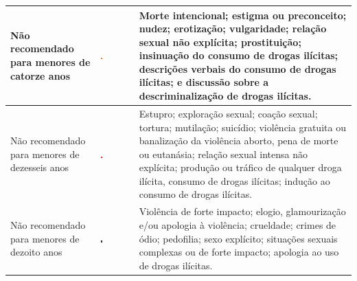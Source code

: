 \begin{table}[!ht]
\begin{tabular}{p{4cm} p{1.5cm} p{8cm}}
		\hline
		Não recomendado para menores de catorze anos &\vfill \includegraphics[width=0.05\textwidth]{img/14anos.png}\vfill &
				Morte intencional; estigma ou preconceito; nudez; erotização; vulgaridade; relação sexual não explícita; prostituição; insinuação do consumo de drogas ilícitas; descrições verbais do 	consumo de drogas ilícitas; e discussão sobre a descriminalização de drogas ilícitas.\\
		\hline
		Não recomendado para menores de dezesseis anos &\vfill \includegraphics[width=0.05\textwidth]{img/16anos.png}\vfill &
				Estupro; exploração sexual; coação sexual; tortura; mutilação; suicídio; violência gratuita ou banalização da violência aborto, pena de morte ou eutanásia; relação sexual intensa não explícita; produção ou tráfico de qualquer droga ilícita, consumo de drogas ilícitas; indução ao consumo de drogas ilícitas.\\
		\hline
		Não recomendado para menores de dezoito anos &\vfill \includegraphics[width=0.05\textwidth]{img/18anos.png}\vfill &
				Violência de forte impacto; elogio, glamourização e/ou apologia à violência; crueldade; crimes de ódio; pedofilia; sexo explícito; situações sexuais complexas ou de forte impacto; apologia ao uso de drogas ilícitas.\\
		\hline
	\end{tabular}
\end{table}
